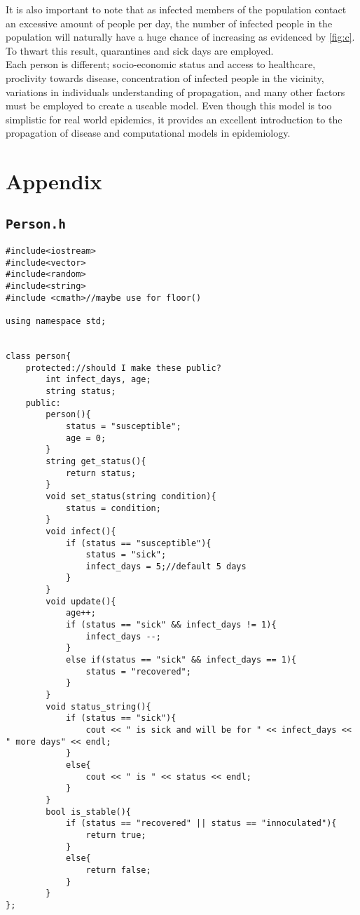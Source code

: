 \documentclass[paper=a4, fontsize=11pt]{scrartcl}
\begin{document}
It is also important to note that as infected members of the population contact an excessive amount of people per day, the number of infected people in the population will naturally have a huge chance of increasing as evidenced by \ref{fig:c}. To thwart this result, quarantines and sick days are employed.\\

Each person is different; socio-economic status and access to healthcare, proclivity towards disease, concentration of infected people in the vicinity, variations in individuals understanding of propagation, and many other factors must be employed to create a useable model. Even though this model is too simplistic for real world epidemics, it provides an excellent introduction to the propagation of disease and computational models in epidemiology.

\newpage
\section{Appendix}
\subsection{\texttt{Person.h}}

\begin{lstlisting}
#include<iostream>
#include<vector>
#include<random>
#include<string>
#include <cmath>//maybe use for floor()

using namespace std;


class person{
    protected://should I make these public?
        int infect_days, age;
        string status;
    public:
        person(){
            status = "susceptible";
            age = 0;
        }
        string get_status(){
            return status;
        }
        void set_status(string condition){
            status = condition;
        }
        void infect(){
            if (status == "susceptible"){
                status = "sick";
                infect_days = 5;//default 5 days
            }
        }
        void update(){
            age++;
            if (status == "sick" && infect_days != 1){
                infect_days --;
            }
            else if(status == "sick" && infect_days == 1){
                status = "recovered";
            }
        }
        void status_string(){
            if (status == "sick"){
                cout << " is sick and will be for " << infect_days << " more days" << endl;
            }
            else{
                cout << " is " << status << endl;
            }
        }
        bool is_stable(){
            if (status == "recovered" || status == "innoculated"){
                return true;
            }
            else{
                return false;
            }
        }
};
\end{lstlisting}
\end{document}
